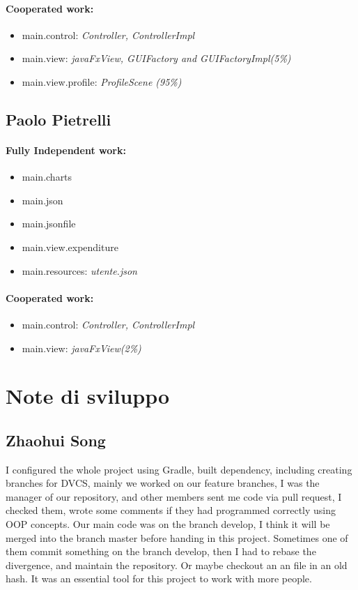 \documentclass[a4paper,12pt]{report}
\begin{document}
\paragraph*{Cooperated work:}
\begin{itemize}
    \item main.control: \textit{Controller, ControllerImpl}
    \item main.view: \textit{javaFxView, GUIFactory and GUIFactoryImpl(5\%)}
    \item main.view.profile: \textit{ProfileScene (95\%)}
\end{itemize}

\subsection{Paolo Pietrelli}
\paragraph*{Fully Independent work:}
\begin{itemize}
    \item main.charts
    \item main.json
    \item main.jsonfile
    \item main.view.expenditure
    \item main.resources: \textit{utente.json}
\end{itemize}
\paragraph*{Cooperated work:}
\begin{itemize}
    \item main.control: \textit{Controller, ControllerImpl}
    \item main.view: \textit{javaFxView(2\%)}
\end{itemize}

\section{Note di sviluppo}

\subsection{Zhaohui Song}
I configured the whole project using Gradle, built dependency, including creating branches for DVCS, 
%
mainly we worked on our feature branches, I was the manager of our repository, and other members sent me code via pull request, I checked them, wrote some comments if they had programmed correctly using OOP concepts. 
%
Our main code was on the branch develop, I think it will be merged into the branch master before handing in this project.
%
Sometimes one of them commit something on the branch develop, then I had to rebase the divergence, and maintain the repository. Or maybe checkout an an file in an old hash. It was an essential tool for this project to work with more people. 
\end{document}
